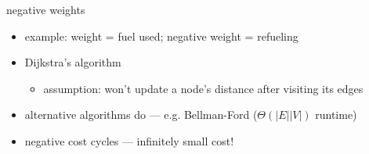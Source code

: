 \begin{frame}{negative weights}
\begin{itemize}
\item example: weight = fuel used; negative weight = refueling
\item Dijkstra's algorithm 
    \begin{itemize}
    \item assumption: won't update a node's distance after visiting its edges
    \end{itemize}
\item alternative algorithms do --- e.g. Bellman-Ford ($\Theta(|E||V|)$ runtime)
\vspace{.5cm}
\item negative cost cycles --- infinitely small cost!
\end{itemize}
\end{frame}
